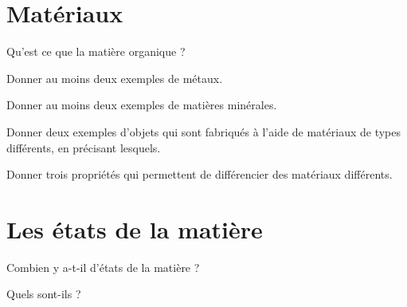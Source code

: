 
\section{Matériaux}

\begin{questions}
	\question Qu'est ce que la matière organique ?
	\fillwithdottedlines{2cm}
	
	\question Donner au moins deux exemples de métaux.
	\fillwithdottedlines{1.5cm}
	
	
	\question Donner au moins deux exemples de matières minérales.
	\fillwithdottedlines{1.5cm}
	
		
	\question Donner deux exemples d'objets qui sont fabriqués à l'aide de matériaux de types différents, en précisant lesquels.
	\fillwithdottedlines{4cm}
	
	\question Donner trois propriétés qui permettent de différencier des matériaux différents.
	\fillwithdottedlines{2cm}
	
\end{questions}


\section{Les états de la matière}

\begin{questions}
	\question Combien y a-t-il d'états de la matière ?
	\fillwithdottedlines{1cm}
	
	\question Quels sont-ils ?
	\fillwithdottedlines{2cm}
\end{questions}

